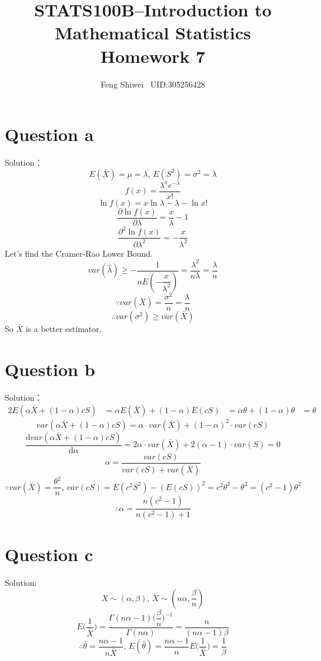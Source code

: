 \documentclass[a4papers]{ctexart}
\title{STATS100B--Introduction to Mathematical Statistics \\Homework 7}
\author{Feng Shiwei \ UID:305256428}
\date{}
\begin{document}
\maketitle
\section*{Question a}
\noindent Solution：\\
\indent 
\[E(\bar{X}) = \mu = \lambda,\, E(S^2)=\sigma^2=\lambda\]
\[ f(x) = \dfrac {\lambda ^{x}e^{-\lambda }}{x!}\]
\[\ln f\left( x\right) =x\ln \lambda -\lambda -\ln x!\]
\[\dfrac {\partial \ln f\left( x\right) }{\partial \lambda }=\dfrac {x}{\lambda }-1\]
\[\dfrac {\partial ^{2}\ln f\left( x\right) }{\partial \lambda ^{2}}=-\dfrac {x}{\lambda ^{2}}\]
Let's find the Cramer-Rao Lower Bound.
\[var\left( \hat {\lambda }\right) \ge -\dfrac {1}{nE\left( -\dfrac {x}{\lambda ^{2}}\right) }=\dfrac {\lambda ^{2}}{n\lambda }=\dfrac {\lambda }{n}\]
\[\because var(\bar{X})=\dfrac{\sigma^2}{n}=\dfrac{\lambda}{n} \]
\[\therefore var(\sigma^2)\ge var(\bar{X})\]
So $\bar{X}$ is a better estimator.

\section*{Question b}
\noindent  Solution：
\begin{alignat*}{2}
 E\left( \alpha \bar {X}+\left( 1-\alpha \right) cS \right) 
 &= \alpha E\left( \bar {X}\right) +\left( 1-\alpha \right) E\left( cS\right) 
 &=\alpha \theta +\left( 1-\alpha \right) \theta
 &=\theta 
\end{alignat*}
\[var\left( \alpha \bar {X}+\left( 1-\alpha \right) cS\right) =\alpha \cdot var\left( \bar {X}\right) +\left( 1-\alpha \right) ^{2}\cdot var\left( cS\right) \]
\[\dfrac {\mathrm{d} var\left( \alpha \bar {X}+\left( 1-\alpha \right) cS\right) }{\mathrm{d}\alpha }
    = 2\alpha \cdot var\left( \bar {X}\right) +2\left( \alpha -1\right) \cdot var\left( S\right) 
    = 0
\]
\[\alpha =\dfrac {var\left( cS\right) }{var\left( cS\right) +var\left( \bar {X}\right) }\]
\[ \because var(\bar{X}) = \dfrac{\theta^2}{n},\,
var(cS)=E(c^2S^2)-(E(cS))^2=c^2\theta^2-\theta^2=(c^2-1)\theta^2 \]
\[\therefore \alpha = \dfrac{n(c^2-1)}{n(c^2-1)+1} \]



\section*{Question c}
\noindent Solution:
\[X\sim (\alpha,\beta),\,\bar{X}\sim(n\alpha,\dfrac{\beta}{n})\]
\[E\Big(\dfrac{1}{\bar{X}}\Big) = \dfrac{\Gamma(n\alpha-1)\Big(\dfrac{\beta}{n}\Big)^{-1}}{\Gamma(n\alpha)}
= \dfrac{n}{(n\alpha-1)\beta}\]
\[\therefore \hat{\theta} = \dfrac{n\alpha-1}{n\bar{X}},\,
E( \hat{\theta} ) = \dfrac{n\alpha-1}{n} E\Big(\dfrac{1}{\bar{X}}\Big) = \dfrac{1}{\beta}  \]
\end{document}
